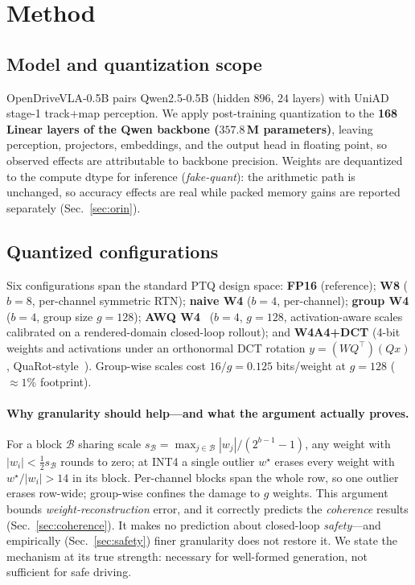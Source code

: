 \documentclass[conference]{IEEEtran}
\begin{document}
\section{Method}
\subsection{Model and quantization scope}
OpenDriveVLA-0.5B pairs Qwen2.5-0.5B (hidden $896$, $24$ layers) with UniAD stage-1 track+map
perception. We apply post-training quantization to the \textbf{168 Linear layers of the Qwen
backbone ($357.8$\,M parameters)}, leaving perception, projectors, embeddings, and the output
head in floating point, so observed effects are attributable to backbone precision. Weights
are dequantized to the compute dtype for inference (\emph{fake-quant}): the arithmetic path
is unchanged, so accuracy effects are real while packed memory gains are reported separately
(Sec.~\ref{sec:orin}).

\subsection{Quantized configurations}
\label{sec:configs}
Six configurations span the standard PTQ design space: \textbf{FP16} (reference);
\textbf{W8} ($b{=}8$, per-channel symmetric RTN); \textbf{naive W4} ($b{=}4$, per-channel);
\textbf{group W4} ($b{=}4$, group size $g{=}128$); \textbf{AWQ W4}~\cite{awq} ($b{=}4$,
$g{=}128$, activation-aware scales calibrated on a rendered-domain closed-loop rollout); and
\textbf{W4A4+DCT} (4-bit weights and activations under an orthonormal DCT rotation
$y=(WQ^\top)(Qx)$, QuaRot-style~\cite{quarot}). Group-wise scales cost $16/g=0.125$
bits/weight at $g{=}128$ ($\approx1\%$ footprint).

\paragraph{Why granularity should help---and what the argument actually proves.}
For a block $\mathcal{B}$ sharing scale
$s_\mathcal{B}=\max_{j\in\mathcal{B}}|w_j|/(2^{b-1}-1)$, any weight with
$|w_i|<\tfrac12 s_\mathcal{B}$ rounds to zero; at INT4 a single outlier
$w^\star$ erases every weight with $w^\star/|w_i|>14$ in its block. Per-channel blocks span
the whole row, so one outlier erases row-wide; group-wise confines the damage to $g$ weights.
This argument bounds \emph{weight-reconstruction} error, and it correctly predicts the
\emph{coherence} results (Sec.~\ref{sec:coherence}). It makes no prediction about closed-loop
\emph{safety}---and empirically (Sec.~\ref{sec:safety}) finer granularity does not restore
it. We state the mechanism at its true strength: necessary for well-formed generation, not
sufficient for safe driving.
\end{document}
